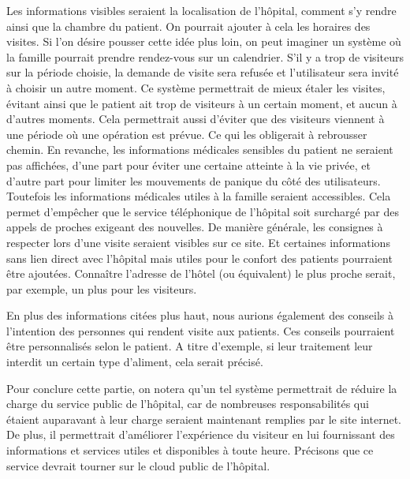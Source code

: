 Les informations visibles seraient la localisation de l'hôpital, comment s'y rendre ainsi que la chambre du patient. On pourrait
ajouter à cela les horaires des visites. Si l'on désire pousser cette idée plus loin, on peut imaginer un système où la famille
pourrait prendre rendez-vous sur un calendrier. S'il y a trop de visiteurs sur la période choisie, la demande de visite sera
refusée et l'utilisateur sera invité à choisir un autre moment. Ce système permettrait de mieux étaler les visites, évitant ainsi
que le patient ait trop de visiteurs à un certain moment, et aucun à d'autres moments. Cela permettrait aussi d'éviter que des
visiteurs viennent à une période où une opération est prévue. Ce qui les obligerait à rebrousser chemin. En revanche, les
informations médicales sensibles du patient ne seraient pas affichées, d'une part pour éviter une certaine atteinte à la vie
privée, et d'autre part pour limiter les mouvements de panique du côté des utilisateurs. Toutefois les informations médicales
utiles à la famille seraient accessibles. Cela permet d'empêcher que le service téléphonique de l'hôpital soit  surchargé par des
appels de proches exigeant des nouvelles. De manière générale, les consignes à respecter lors d'une visite seraient visibles sur
ce site. Et certaines informations sans lien direct avec l'hôpital mais utiles pour le confort des patients pourraient être
ajoutées. Connaître l'adresse de l'hôtel (ou équivalent) le plus proche serait, par exemple, un plus pour les visiteurs.
\newline

En plus des informations citées plus haut, nous aurions également des conseils à l'intention des personnes qui rendent visite aux
patients. Ces conseils pourraient être personnalisés selon le patient. A titre d'exemple, si leur traitement leur interdit un certain type d'aliment,
cela serait précisé. 
\newline

Pour conclure cette partie, on notera qu'un tel système permettrait de réduire la charge du service public de l'hôpital, car de
nombreuses responsabilités qui étaient auparavant à leur charge seraient maintenant remplies par le site internet. De plus, il permettrait
d'améliorer l'expérience du visiteur en lui fournissant des informations et services utiles et disponibles à toute heure.
Précisons que ce service devrait tourner sur le cloud public de l'hôpital.
\newline

